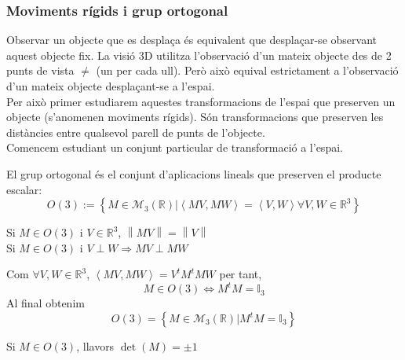 \documentclass[../main.tex]{subfiles}
\begin{document}
	\subsubsection{Moviments rígids i grup ortogonal}

	Observar un objecte que es desplaça és equivalent que desplaçar-se observant aquest objecte fix. La visió 3D utilitza l'observació d'un mateix objecte des de 2 punts de vista $\neq$ (un per cada ull). Però això equival estrictament a l'observació d'un mateix objecte desplaçant-se a l'espai.\\
	Per això primer estudiarem aquestes transformacions de l'espai que preserven un objecte (s'anomenen moviments rígids). Són transformacions que preserven les distàncies entre qualsevol parell de punts de l'objecte.\\
	Comencem estudiant un conjunt particular de transformació a l'espai.

	\begin{definicio}
	    El grup ortogonal és el conjunt d'aplicacions lineals que preserven el producte escalar:
	    \begin{displaymath}
	        O(3) := \left\{M \in \mathcal{M}_3\left(\mathbb{R}\right) | \left\langle MV, MW \right\rangle = \left\langle V, W\right\rangle \forall V, W \in \mathbb{R}^3 \right\}
	    \end{displaymath}
	\end{definicio}

	\begin{obs}
	    Si $M \in O(3)$ i $V \in \mathbb{R}^3$, $\left\lVert MV\right\rVert = \left\lVert V\right\rVert$\\
	    Si $M\in O(3)$ i $V\perp W \Rightarrow MV \perp MW$
	\end{obs}

	Com $\forall V, W \in \mathbb{R}^3$, $\left\langle MV, MW\right\rangle = V^tM^tMW$ per tant,
	\begin{displaymath}
	    M \in O(3) \Leftrightarrow M^tM = \mathbb{I}_3
	\end{displaymath}
	Al final obtenim
	\begin{displaymath}
	    O(3) = \left\{M \in \mathcal{M}_3\left(\mathbb{R}\right) | M^tM = \mathbb{I}_3\right\}
	\end{displaymath}

	\begin{proposicio}
	    Si $M \in O(3)$, llavors $\det\left(M\right) = \pm 1$
	\end{proposicio}
\end{document}
